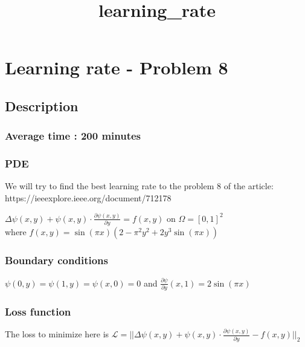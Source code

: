\documentclass[11pt]{article}
\title{learning\_rate}
\begin{document}
    
    \maketitle
    
    

    
    \hypertarget{learning-rate---problem-8}{%
\section{Learning rate - Problem 8}\label{learning-rate---problem-8}}

\hypertarget{description}{%
\subsection{Description}\label{description}}

\hypertarget{average-time-200-minutes}{%
\subsubsection{Average time : 200
minutes}\label{average-time-200-minutes}}

\hypertarget{pde}{%
\subsubsection{PDE}\label{pde}}

We will try to find the best learning rate to the problem 8 of the
article: https://ieeexplore.ieee.org/document/712178

\(\Delta \psi(x,y) +\psi(x,y)\cdot\frac{\partial \psi(x,y)}{\partial y}= f(x,y)\)
on \(\Omega = [0,1]^2\)\\
where \(f(x, y)=\sin(\pi x)(2-\pi^2y^2+2y^3\sin(\pi x))\)

\hypertarget{boundary-conditions}{%
\subsubsection{Boundary conditions}\label{boundary-conditions}}

\(\psi(0,y)=\psi(1,y)=\psi(x,0)=0\) and
\(\frac{\partial \psi}{\partial y}(x,1)=2\sin(\pi x)\)

\hypertarget{loss-function}{%
\subsubsection{Loss function}\label{loss-function}}

The loss to minimize here is
\(\mathcal{L} = ||\Delta \psi(x,y) +\psi(x,y)\cdot\frac{\partial \psi(x,y)}{\partial y}-f(x,y) ||_2\)
\end{document}
